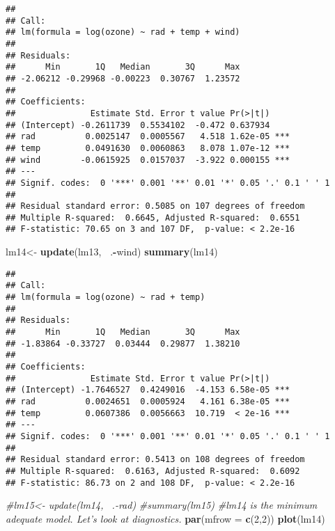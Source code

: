 \documentclass[]{article}
\newenvironment{Shaded}{\begin{snugshade}}{\end{snugshade}}
\newcommand{\KeywordTok}[1]{\textcolor[rgb]{0.13,0.29,0.53}{\textbf{#1}}}
\newcommand{\DataTypeTok}[1]{\textcolor[rgb]{0.13,0.29,0.53}{#1}}
\newcommand{\DecValTok}[1]{\textcolor[rgb]{0.00,0.00,0.81}{#1}}
\newcommand{\StringTok}[1]{\textcolor[rgb]{0.31,0.60,0.02}{#1}}
\newcommand{\CommentTok}[1]{\textcolor[rgb]{0.56,0.35,0.01}{\textit{#1}}}
\newcommand{\OperatorTok}[1]{\textcolor[rgb]{0.81,0.36,0.00}{\textbf{#1}}}
\newcommand{\NormalTok}[1]{#1}
\begin{document}
\begin{verbatim}
## 
## Call:
## lm(formula = log(ozone) ~ rad + temp + wind)
## 
## Residuals:
##      Min       1Q   Median       3Q      Max 
## -2.06212 -0.29968 -0.00223  0.30767  1.23572 
## 
## Coefficients:
##               Estimate Std. Error t value Pr(>|t|)    
## (Intercept) -0.2611739  0.5534102  -0.472 0.637934    
## rad          0.0025147  0.0005567   4.518 1.62e-05 ***
## temp         0.0491630  0.0060863   8.078 1.07e-12 ***
## wind        -0.0615925  0.0157037  -3.922 0.000155 ***
## ---
## Signif. codes:  0 '***' 0.001 '**' 0.01 '*' 0.05 '.' 0.1 ' ' 1
## 
## Residual standard error: 0.5085 on 107 degrees of freedom
## Multiple R-squared:  0.6645, Adjusted R-squared:  0.6551 
## F-statistic: 70.65 on 3 and 107 DF,  p-value: < 2.2e-16
\end{verbatim}

\begin{Shaded}
\begin{Highlighting}[]
\NormalTok{lm14<-}\StringTok{ }\KeywordTok{update}\NormalTok{(lm13, }\OperatorTok{~}\NormalTok{.}\OperatorTok{-}\NormalTok{wind)}
\KeywordTok{summary}\NormalTok{(lm14)}
\end{Highlighting}
\end{Shaded}

\begin{verbatim}
## 
## Call:
## lm(formula = log(ozone) ~ rad + temp)
## 
## Residuals:
##      Min       1Q   Median       3Q      Max 
## -1.83864 -0.33727  0.03444  0.29877  1.38210 
## 
## Coefficients:
##               Estimate Std. Error t value Pr(>|t|)    
## (Intercept) -1.7646527  0.4249016  -4.153 6.58e-05 ***
## rad          0.0024651  0.0005924   4.161 6.38e-05 ***
## temp         0.0607386  0.0056663  10.719  < 2e-16 ***
## ---
## Signif. codes:  0 '***' 0.001 '**' 0.01 '*' 0.05 '.' 0.1 ' ' 1
## 
## Residual standard error: 0.5413 on 108 degrees of freedom
## Multiple R-squared:  0.6163, Adjusted R-squared:  0.6092 
## F-statistic: 86.73 on 2 and 108 DF,  p-value: < 2.2e-16
\end{verbatim}

\begin{Shaded}
\begin{Highlighting}[]
\CommentTok{#lm15<- update(lm14, ~.-rad)}
\CommentTok{#summary(lm15)}
\CommentTok{#lm14 is the minimum adequate model. Let's look at diagnostics. }
  \KeywordTok{par}\NormalTok{(}\DataTypeTok{mfrow =} \KeywordTok{c}\NormalTok{(}\DecValTok{2}\NormalTok{,}\DecValTok{2}\NormalTok{)) }
  \KeywordTok{plot}\NormalTok{(lm14)}
\end{Highlighting}
\end{Shaded}
\end{document}
